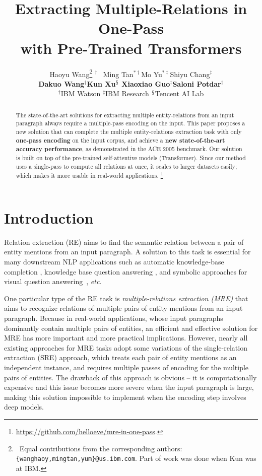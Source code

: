 \documentclass[11pt,a4paper]{article}
\title{Extracting Multiple-Relations in One-Pass \\ with Pre-Trained Transformers}
\author{
 Haoyu Wang\thanks{\, Equal contributions from the corresponding authors: \texttt{\{wanghaoy,mingtan,yum\}@us.ibm.com}. Part of work was done when Kun was at IBM.} $^\dagger$ \quad \quad \   Ming Tan$^{*\dagger}$\quad \quad Mo Yu$^{*\ddagger}$\quad \quad Shiyu Chang$^\ddagger$ \\ 
 \textbf{Dakuo Wang}$^\ddagger$\quad \quad \textbf{Kun Xu}$^\mathsection$ \quad \quad \textbf{Xiaoxiao Guo}$^\ddagger$\quad \quad \textbf{Saloni Potdar}$^\dagger$\\
 $^\dagger$IBM Watson \quad \quad $^\ddagger$IBM Research \quad \quad $^\mathsection$Tencent AI Lab\\
}
\date{}
\begin{document}
\maketitle
\begin{abstract}
The state-of-the-art solutions for extracting multiple entity-relations from an input paragraph always require a multiple-pass encoding on the input.
This paper proposes a new solution that can complete the multiple entity-relations extraction task with only \textbf{one-pass encoding} on the input corpus, and achieve a \textbf{new state-of-the-art accuracy performance}, as demonstrated in the ACE 2005 benchmark. Our solution is built on top of the pre-trained self-attentive models (Transformer). Since our method uses a single-pass to compute all relations at once, it scales to larger datasets easily; which makes it more usable in real-world applications. \footnote{\scriptsize{\url{https://github.com/helloeve/mre-in-one-pass}.}}

\end{abstract}



\section{Introduction}
Relation extraction (RE) aims to find the semantic relation between a pair of entity mentions from an input paragraph. A solution to this task is essential for many downstream NLP applications such as automatic knowledge-base completion \cite{surdeanu2012multi,riedel2013relation,verga2016multilingual},  knowledge base question answering \cite{yih2015semantic,xu2016question,yu2017improved}, and symbolic approaches for visual question answering~\cite{mao2019neuro,hu2019language}, \emph{etc}. 

One particular type of the RE task is \emph{multiple-relations extraction (MRE)} that aims to recognize relations of multiple pairs of entity mentions from an input paragraph. Because in real-world applications, whose input paragraphs dominantly contain multiple pairs of entities, an efficient and effective solution for MRE has more important and more practical implications. However, nearly all existing approaches for MRE tasks \cite{qu2014senti,gormley2015improved,nguyen2015combining} adopt some variations of the single-relation extraction (SRE) approach, which treats each pair of entity mentions as an independent instance, and requires multiple passes of encoding for the multiple pairs of entities.  The drawback of this approach is obvious -- it is computationally expensive and this issue becomes more severe when the input paragraph is large, making this solution impossible to implement when the encoding step involves deep models.
\end{document}
